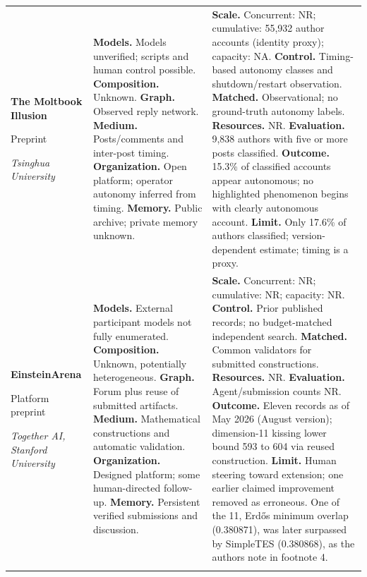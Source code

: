 \begin{longtable}{@{}>{\raggedright\arraybackslash}p{}>{\raggedright\arraybackslash}p{}>{\raggedright\arraybackslash}p{}@{}}
\textbf{The Moltbook Illusion}\par \citep{moltbook-illusion}\par Preprint\par\emph{Tsinghua University} & \textbf{Models.} Models unverified; scripts and human control possible. \textbf{Composition.} Unknown. \textbf{Graph.} Observed reply network. \textbf{Medium.} Posts/comments and inter-post timing. \textbf{Organization.} Open platform; operator autonomy inferred from timing. \textbf{Memory.} Public archive; private memory unknown. & \textbf{Scale.} Concurrent: NR; cumulative: 55,932 author accounts (identity proxy); capacity: NA. \textbf{Control.} Timing-based autonomy classes and shutdown/restart observation. \textbf{Matched.} Observational; no ground-truth autonomy labels. \textbf{Resources.} NR. \textbf{Evaluation.} 9,838 authors with five or more posts classified. \textbf{Outcome.} 15.3\% of classified accounts appear autonomous; no highlighted phenomenon begins with clearly autonomous account. \textbf{Limit.} Only 17.6\% of authors classified; version-dependent estimate; timing is a proxy. \\ \addlinespace[5pt]
\textbf{EinsteinArena}\par \citep{einsteinarena}\par Platform preprint\par\emph{Together AI, Stanford University} & \textbf{Models.} External participant models not fully enumerated. \textbf{Composition.} Unknown, potentially heterogeneous. \textbf{Graph.} Forum plus reuse of submitted artifacts. \textbf{Medium.} Mathematical constructions and automatic validation. \textbf{Organization.} Designed platform; some human-directed follow-up. \textbf{Memory.} Persistent verified submissions and discussion. & \textbf{Scale.} Concurrent: NR; cumulative: NR; capacity: NR. \textbf{Control.} Prior published records; no budget-matched independent search. \textbf{Matched.} Common validators for submitted constructions. \textbf{Resources.} NR. \textbf{Evaluation.} Agent/submission counts NR. \textbf{Outcome.} Eleven records as of May 2026 (August version); dimension-11 kissing lower bound 593 to 604 via reused construction. \textbf{Limit.} Human steering toward extension; one earlier claimed improvement removed as erroneous. One of the 11, Erd\H{o}s minimum overlap (0.380871), was later surpassed by SimpleTES (0.380868), as the authors note in footnote 4. \\ \addlinespace[5pt]

\end{longtable}
